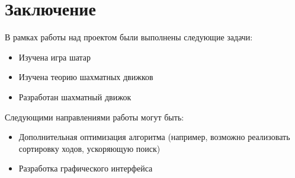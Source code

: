{

	\chapter*{Заключение}
	В рамках работы над проектом были выполнены следующие задачи:
	\begin{itemize}
		\item Изучена игра шатар
		\item Изучена теорию шахматных движков
		\item Разработан шахматный движок
	\end{itemize}
	
	Следующими направлениями работы могут быть:
	\begin{itemize}
		\item Дополнительная оптимизация алгоритма (например, возможно реализовать сортировку ходов, ускоряющую поиск)
		\item Разработка графического интерфейса
	\end{itemize}
	\clearpage

}